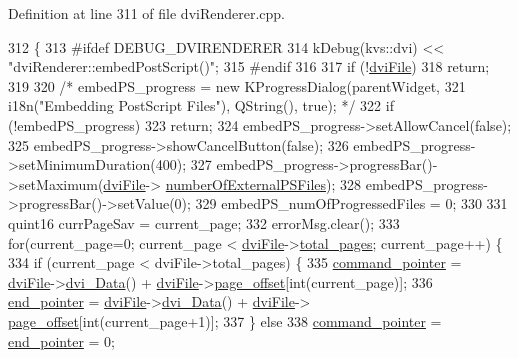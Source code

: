 Definition at line 311 of file dvi\+Renderer.\+cpp.


\begin{DoxyCode}
312 \{
313 \textcolor{preprocessor}{#ifdef DEBUG\_DVIRENDERER}
314   kDebug(kvs::dvi) << \textcolor{stringliteral}{"dviRenderer::embedPostScript()"};
315 \textcolor{preprocessor}{#endif}
316 
317   \textcolor{keywordflow}{if} (!\hyperlink{classdviRenderer_a67ded13a1a8da343aa0ee921ed96d4c2}{dviFile})
318     \textcolor{keywordflow}{return};
319 
320 \textcolor{comment}{/*  embedPS\_progress = new KProgressDialog(parentWidget,}
321 \textcolor{comment}{                                         i18n("Embedding PostScript Files"), QString(), true); */}
322   \textcolor{keywordflow}{if} (!embedPS\_progress)
323     \textcolor{keywordflow}{return};
324   embedPS\_progress->setAllowCancel(\textcolor{keyword}{false});
325   embedPS\_progress->showCancelButton(\textcolor{keyword}{false});
326   embedPS\_progress->setMinimumDuration(400);
327   embedPS\_progress->progressBar()->setMaximum(\hyperlink{classdviRenderer_a67ded13a1a8da343aa0ee921ed96d4c2}{dviFile}->
      \hyperlink{classdvifile_abd8bd3fc29f66ce9220efbd0246d7fc0}{numberOfExternalPSFiles});
328   embedPS\_progress->progressBar()->setValue(0);
329   embedPS\_numOfProgressedFiles = 0;
330 
331   quint16 currPageSav = current\_page;
332   errorMsg.clear();
333   \textcolor{keywordflow}{for}(current\_page=0; current\_page < \hyperlink{classdviRenderer_a67ded13a1a8da343aa0ee921ed96d4c2}{dviFile}->\hyperlink{classdvifile_a71577dbd82a462b855abc96be3b369c5}{total\_pages}; current\_page++) \{
334     \textcolor{keywordflow}{if} (current\_page < dviFile->total\_pages) \{
335       \hyperlink{classbigEndianByteReader_aa8919f6fe116fd3230337675fd23abac}{command\_pointer} = \hyperlink{classdviRenderer_a67ded13a1a8da343aa0ee921ed96d4c2}{dviFile}->\hyperlink{classdvifile_a81f1d32c52377a7b1802072eb40998b7}{dvi\_Data}() + 
      \hyperlink{classdviRenderer_a67ded13a1a8da343aa0ee921ed96d4c2}{dviFile}->\hyperlink{classdvifile_aeafc97277647ad5077a774be71b3253a}{page\_offset}[int(current\_page)];
336       \hyperlink{classbigEndianByteReader_ace2790221530572c87c58f1f77924beb}{end\_pointer}     = \hyperlink{classdviRenderer_a67ded13a1a8da343aa0ee921ed96d4c2}{dviFile}->\hyperlink{classdvifile_a81f1d32c52377a7b1802072eb40998b7}{dvi\_Data}() + \hyperlink{classdviRenderer_a67ded13a1a8da343aa0ee921ed96d4c2}{dviFile}->
      \hyperlink{classdvifile_aeafc97277647ad5077a774be71b3253a}{page\_offset}[int(current\_page+1)];
337     \} \textcolor{keywordflow}{else}
338       \hyperlink{classbigEndianByteReader_aa8919f6fe116fd3230337675fd23abac}{command\_pointer} = \hyperlink{classbigEndianByteReader_ace2790221530572c87c58f1f77924beb}{end\_pointer} = 0;

\end{DoxyCode}
